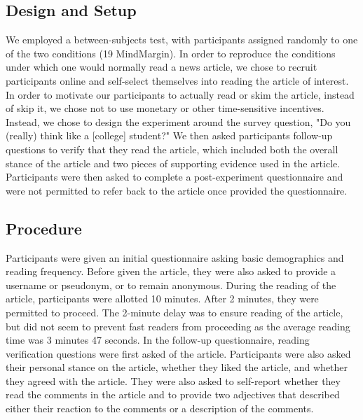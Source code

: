\subsection{Design and Setup}
We employed a between-subjects test, with participants assigned randomly to one of the two conditions (19 MindMargin). In order to reproduce the conditions under which one would normally read a news article, we chose to recruit participants online and self-select themselves into reading the article of interest. In order to motivate our participants to actually read or skim the article, instead of skip it, we chose not to use monetary or other time-sensitive incentives. Instead, we chose to design the experiment around the survey question, "Do you (really) think like a [college] student?" We then asked participants follow-up questions to verify that they read the article, which included both the overall stance of the article and two pieces of supporting evidence used in the article. Participants were then asked to complete a post-experiment questionnaire and were not permitted to refer back to the article once provided the questionnaire. 

\subsection{Procedure}
Participants were given an initial questionnaire asking basic demographics and reading frequency. Before given the article, they were also asked to provide a username or pseudonym, or to remain anonymous. During the reading of the article, participants were allotted 10 minutes. After 2 minutes, they were permitted to proceed. The 2-minute delay was to ensure reading of the article, but did not seem to prevent fast readers from proceeding as the average reading time was 3 minutes 47 seconds. In the follow-up questionnaire, reading verification questions were first asked of the article. Participants were also asked their personal stance on the article, whether they liked the article, and whether they agreed with the article. They were also asked to self-report whether they read the comments in the article and to provide two adjectives that described either their reaction to the comments or a description of the comments.
